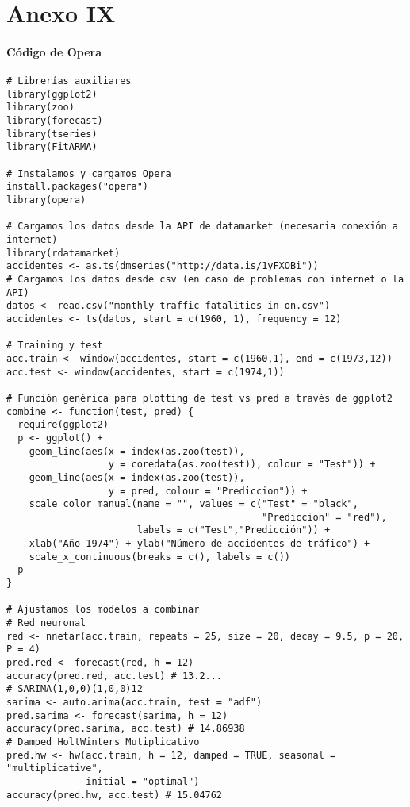 \documentclass[12pt,a4paper,oneside]{article}
\begin{document}
\part*{Anexo IX}

\subsection*{Código de Opera}

\begin{Verbatim}[fontsize=\footnotesize]
# Librerías auxiliares
library(ggplot2)
library(zoo)
library(forecast)
library(tseries)
library(FitARMA)

# Instalamos y cargamos Opera
install.packages("opera")
library(opera)

# Cargamos los datos desde la API de datamarket (necesaria conexión a internet)
library(rdatamarket)
accidentes <- as.ts(dmseries("http://data.is/1yFXOBi"))
# Cargamos los datos desde csv (en caso de problemas con internet o la API)
datos <- read.csv("monthly-traffic-fatalities-in-on.csv")
accidentes <- ts(datos, start = c(1960, 1), frequency = 12)

# Training y test
acc.train <- window(accidentes, start = c(1960,1), end = c(1973,12))
acc.test <- window(accidentes, start = c(1974,1))

# Función genérica para plotting de test vs pred a través de ggplot2
combine <- function(test, pred) {
  require(ggplot2)
  p <- ggplot() +
    geom_line(aes(x = index(as.zoo(test)),
                  y = coredata(as.zoo(test)), colour = "Test")) +
    geom_line(aes(x = index(as.zoo(test)),
                  y = pred, colour = "Prediccion")) +
    scale_color_manual(name = "", values = c("Test" = "black",
                                             "Prediccion" = "red"),
                       labels = c("Test","Predicción")) +
    xlab("Año 1974") + ylab("Número de accidentes de tráfico") +
    scale_x_continuous(breaks = c(), labels = c())
  p
}

# Ajustamos los modelos a combinar
# Red neuronal
red <- nnetar(acc.train, repeats = 25, size = 20, decay = 9.5, p = 20, P = 4)
pred.red <- forecast(red, h = 12)
accuracy(pred.red, acc.test) # 13.2...
# SARIMA(1,0,0)(1,0,0)12
sarima <- auto.arima(acc.train, test = "adf")
pred.sarima <- forecast(sarima, h = 12)
accuracy(pred.sarima, acc.test) # 14.86938
# Damped HoltWinters Mutiplicativo
pred.hw <- hw(acc.train, h = 12, damped = TRUE, seasonal = "multiplicative",
              initial = "optimal")
accuracy(pred.hw, acc.test) # 15.04762


\end{Verbatim}
\end{document}

